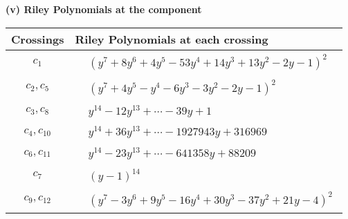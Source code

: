 \documentclass[1p]{elsarticle_modified}
\theoremstyle{definition}
\begin{document}
\flushleft \textbf{(v) Riley Polynomials at the component}\newline \\
\begin{tabular}{m{50pt}|m{274pt}}
Crossings & \hspace{64pt}Riley Polynomials at each crossing \\
\hline $$\begin{aligned}c_{1}\end{aligned}$$&$\begin{aligned}
&(y^7+8 y^6+4 y^5-53 y^4+14 y^3+13 y^2-2 y-1)^2
\end{aligned}$\\
\hline $$\begin{aligned}c_{2},c_{5}\end{aligned}$$&$\begin{aligned}
&(y^7+4 y^5- y^4-6 y^3-3 y^2-2 y-1)^2
\end{aligned}$\\
\hline $$\begin{aligned}c_{3},c_{8}\end{aligned}$$&$\begin{aligned}
&y^{14}-12 y^{13}+\cdots-39 y+1
\end{aligned}$\\
\hline $$\begin{aligned}c_{4},c_{10}\end{aligned}$$&$\begin{aligned}
&y^{14}+36 y^{13}+\cdots-1927943 y+316969
\end{aligned}$\\
\hline $$\begin{aligned}c_{6},c_{11}\end{aligned}$$&$\begin{aligned}
&y^{14}-23 y^{13}+\cdots-641358 y+88209
\end{aligned}$\\
\hline $$\begin{aligned}c_{7}\end{aligned}$$&$\begin{aligned}
&(y-1)^{14}
\end{aligned}$\\
\hline $$\begin{aligned}c_{9},c_{12}\end{aligned}$$&$\begin{aligned}
&(y^7-3 y^6+9 y^5-16 y^4+30 y^3-37 y^2+21 y-4)^2
\end{aligned}$\\
\hline
\end{tabular}\\~\\
\end{document}

